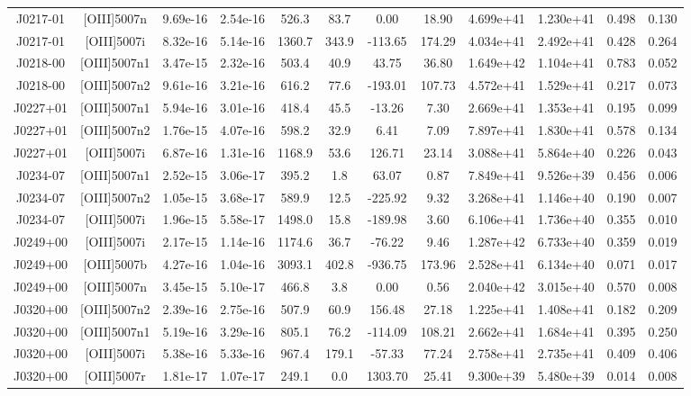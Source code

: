 \begin{table}
\begin{tabular}{cccccccccccc}
J0217-01 & [OIII]5007n & 9.69e-16 & 2.54e-16 & 526.3 & 83.7 & 0.00 & 18.90 & 4.699e+41 & 1.230e+41 & 0.498 & 0.130 \\
J0217-01 & [OIII]5007i & 8.32e-16 & 5.14e-16 & 1360.7 & 343.9 & -113.65 & 174.29 & 4.034e+41 & 2.492e+41 & 0.428 & 0.264 \\
J0218-00 & [OIII]5007n1 & 3.47e-15 & 2.32e-16 & 503.4 & 40.9 & 43.75 & 36.80 & 1.649e+42 & 1.104e+41 & 0.783 & 0.052 \\
J0218-00 & [OIII]5007n2 & 9.61e-16 & 3.21e-16 & 616.2 & 77.6 & -193.01 & 107.73 & 4.572e+41 & 1.529e+41 & 0.217 & 0.073 \\
J0227+01 & [OIII]5007n1 & 5.94e-16 & 3.01e-16 & 418.4 & 45.5 & -13.26 & 7.30 & 2.669e+41 & 1.353e+41 & 0.195 & 0.099 \\
J0227+01 & [OIII]5007n2 & 1.76e-15 & 4.07e-16 & 598.2 & 32.9 & 6.41 & 7.09 & 7.897e+41 & 1.830e+41 & 0.578 & 0.134 \\
J0227+01 & [OIII]5007i & 6.87e-16 & 1.31e-16 & 1168.9 & 53.6 & 126.71 & 23.14 & 3.088e+41 & 5.864e+40 & 0.226 & 0.043 \\
J0234-07 & [OIII]5007n1 & 2.52e-15 & 3.06e-17 & 395.2 & 1.8 & 63.07 & 0.87 & 7.849e+41 & 9.526e+39 & 0.456 & 0.006 \\
J0234-07 & [OIII]5007n2 & 1.05e-15 & 3.68e-17 & 589.9 & 12.5 & -225.92 & 9.32 & 3.268e+41 & 1.146e+40 & 0.190 & 0.007 \\
J0234-07 & [OIII]5007i & 1.96e-15 & 5.58e-17 & 1498.0 & 15.8 & -189.98 & 3.60 & 6.106e+41 & 1.736e+40 & 0.355 & 0.010 \\
J0249+00 & [OIII]5007i & 2.17e-15 & 1.14e-16 & 1174.6 & 36.7 & -76.22 & 9.46 & 1.287e+42 & 6.733e+40 & 0.359 & 0.019 \\
J0249+00 & [OIII]5007b & 4.27e-16 & 1.04e-16 & 3093.1 & 402.8 & -936.75 & 173.96 & 2.528e+41 & 6.134e+40 & 0.071 & 0.017 \\
J0249+00 & [OIII]5007n & 3.45e-15 & 5.10e-17 & 466.8 & 3.8 & 0.00 & 0.56 & 2.040e+42 & 3.015e+40 & 0.570 & 0.008 \\
J0320+00 & [OIII]5007n2 & 2.39e-16 & 2.75e-16 & 507.9 & 60.9 & 156.48 & 27.18 & 1.225e+41 & 1.408e+41 & 0.182 & 0.209 \\
J0320+00 & [OIII]5007n1 & 5.19e-16 & 3.29e-16 & 805.1 & 76.2 & -114.09 & 108.21 & 2.662e+41 & 1.684e+41 & 0.395 & 0.250 \\
J0320+00 & [OIII]5007i & 5.38e-16 & 5.33e-16 & 967.4 & 179.1 & -57.33 & 77.24 & 2.758e+41 & 2.735e+41 & 0.409 & 0.406 \\
J0320+00 & [OIII]5007r & 1.81e-17 & 1.07e-17 & 249.1 & 0.0 & 1303.70 & 25.41 & 9.300e+39 & 5.480e+39 & 0.014 & 0.008 \\

\end{tabular}
\end{table}
